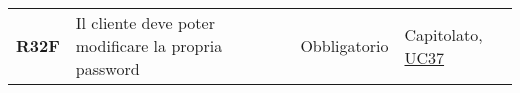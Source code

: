 \begin{center}
\begin{longtable}[!h]{p{50px} p{245px} p{75px} p{50px}}
        \textbf{R32F}                         & Il cliente deve poter modificare la propria password                                                & Obbligatorio             & Capitolato, \hyperref[sec:UC37]{UC37}          \\
    \end{longtable}
\end{center}
\newpage
